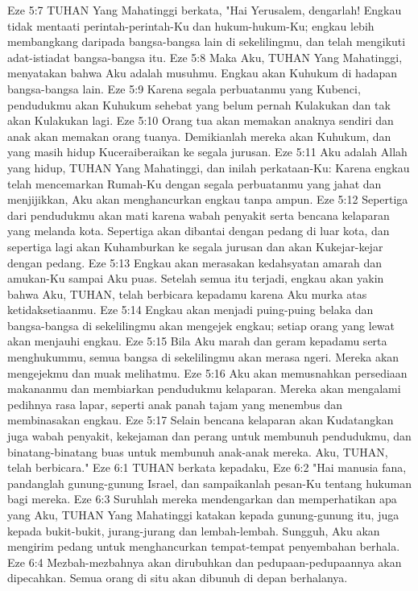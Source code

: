 Eze 5:7  TUHAN Yang Mahatinggi berkata, "Hai Yerusalem, dengarlah! Engkau tidak mentaati perintah-perintah-Ku dan hukum-hukum-Ku; engkau lebih membangkang daripada bangsa-bangsa lain di sekelilingmu, dan telah mengikuti adat-istiadat bangsa-bangsa itu.
Eze 5:8  Maka Aku, TUHAN Yang Mahatinggi, menyatakan bahwa Aku adalah musuhmu. Engkau akan Kuhukum di hadapan bangsa-bangsa lain.
Eze 5:9  Karena segala perbuatanmu yang Kubenci, pendudukmu akan Kuhukum sehebat yang belum pernah Kulakukan dan tak akan Kulakukan lagi.
Eze 5:10  Orang tua akan memakan anaknya sendiri dan anak akan memakan orang tuanya. Demikianlah mereka akan Kuhukum, dan yang masih hidup Kuceraiberaikan ke segala jurusan.
Eze 5:11  Aku adalah Allah yang hidup, TUHAN Yang Mahatinggi, dan inilah perkataan-Ku: Karena engkau telah mencemarkan Rumah-Ku dengan segala perbuatanmu yang jahat dan menjijikkan, Aku akan menghancurkan engkau tanpa ampun.
Eze 5:12  Sepertiga dari pendudukmu akan mati karena wabah penyakit serta bencana kelaparan yang melanda kota. Sepertiga akan dibantai dengan pedang di luar kota, dan sepertiga lagi akan Kuhamburkan ke segala jurusan dan akan Kukejar-kejar dengan pedang.
Eze 5:13  Engkau akan merasakan kedahsyatan amarah dan amukan-Ku sampai Aku puas. Setelah semua itu terjadi, engkau akan yakin bahwa Aku, TUHAN, telah berbicara kepadamu karena Aku murka atas ketidaksetiaanmu.
Eze 5:14  Engkau akan menjadi puing-puing belaka dan bangsa-bangsa di sekelilingmu akan mengejek engkau; setiap orang yang lewat akan menjauhi engkau.
Eze 5:15  Bila Aku marah dan geram kepadamu serta menghukummu, semua bangsa di sekelilingmu akan merasa ngeri. Mereka akan mengejekmu dan muak melihatmu.
Eze 5:16  Aku akan memusnahkan persediaan makananmu dan membiarkan pendudukmu kelaparan. Mereka akan mengalami pedihnya rasa lapar, seperti anak panah tajam yang menembus dan membinasakan engkau.
Eze 5:17  Selain bencana kelaparan akan Kudatangkan juga wabah penyakit, kekejaman dan perang untuk membunuh pendudukmu, dan binatang-binatang buas untuk membunuh anak-anak mereka. Aku, TUHAN, telah berbicara."
Eze 6:1  TUHAN berkata kepadaku,
Eze 6:2  "Hai manusia fana, pandanglah gunung-gunung Israel, dan sampaikanlah pesan-Ku tentang hukuman bagi mereka.
Eze 6:3  Suruhlah mereka mendengarkan dan memperhatikan apa yang Aku, TUHAN Yang Mahatinggi katakan kepada gunung-gunung itu, juga kepada bukit-bukit, jurang-jurang dan lembah-lembah. Sungguh, Aku akan mengirim pedang untuk menghancurkan tempat-tempat penyembahan berhala.
Eze 6:4  Mezbah-mezbahnya akan dirubuhkan dan pedupaan-pedupaannya akan dipecahkan. Semua orang di situ akan dibunuh di depan berhalanya.
